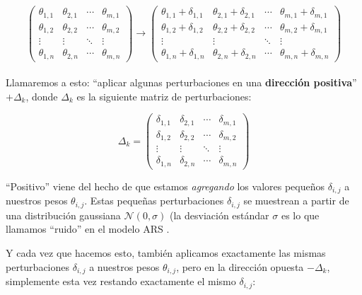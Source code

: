 \documentclass[
]{book}
\begin{document}
\[
\begin{pmatrix}
\theta_{1,1} & \theta_{2,1} & \cdots & \theta_{m,1} \\
\theta_{1,2} & \theta_{2,2} & \cdots & \theta_{m,2} \\
\vdots & \vdots & \ddots & \vdots \\
\theta_{1,n} & \theta_{2,n} & \cdots & \theta_{m,n}
\end{pmatrix}
\longrightarrow
\begin{pmatrix}
\theta_{1,1} + \delta_{1,1} & \theta_{2,1} + \delta_{2,1} & \cdots & \theta_{m,1} + \delta_{m,1} \\
\theta_{1,2} + \delta_{1,2} & \theta_{2,2} + \delta_{2,2} & \cdots & \theta_{m,2} + \delta_{m,1} \\
\vdots & \vdots & \ddots & \vdots \\
\theta_{1,n} + \delta_{1,n} & \theta_{2,n} + \delta_{2,n} & \cdots & \theta_{m,n} + \delta_{m,n}
\end{pmatrix}
\]\\

Llamaremos a esto: ``aplicar algunas perturbaciones en una \textbf{dirección positiva}'' \(+\Delta_k\), donde \(\Delta_k\) es la siguiente matriz de perturbaciones:

\[
\Delta_k
=
\begin{pmatrix}
\delta_{1,1} & \delta_{2,1} & \cdots & \delta_{m,1} \\
\delta_{1,2} & \delta_{2,2} & \cdots & \delta_{m,2} \\
\vdots & \vdots & \ddots & \vdots \\
\delta_{1,n} & \delta_{2,n} & \cdots & \delta_{m,n}
\end{pmatrix}
\]

``Positivo'' viene del hecho de que estamos \emph{agregando} los valores pequeños \(\delta_{i, j}\) a nuestros pesos \(\theta_{i, j}\). Estas pequeñas perturbaciones \(\delta_{i, j}\) se muestrean a partir de una distribución gaussiana \(\mathcal{N}(0, \sigma)\) (la desviación estándar \(\sigma\) es lo que llamamos ``ruido'' en el modelo ARS .

Y cada vez que hacemos esto, también aplicamos exactamente las mismas perturbaciones \(\delta_{i, j}\) a nuestros pesos \(\theta_{i, j}\), pero en la dirección opuesta \(-\Delta_k\), simplemente esta vez restando exactamente el mismo \(\delta_{i, j}\):
\end{document}
